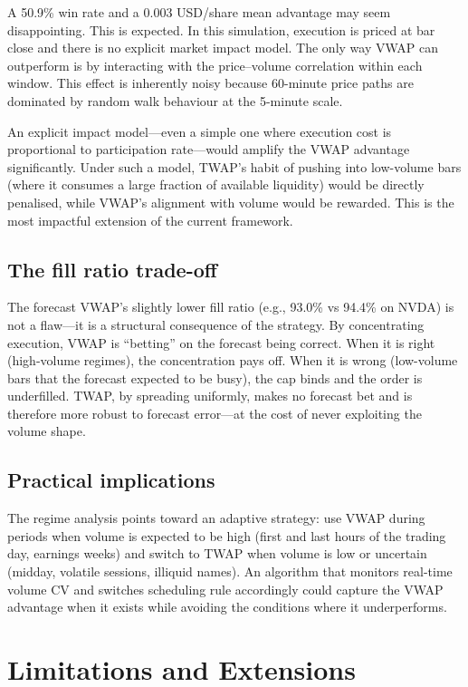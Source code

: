 \documentclass[10pt,twocolumn]{article}
\begin{document}
A 50.9\% win rate and a 0.003 USD/share mean advantage may seem disappointing. This is expected. In this simulation, execution is priced at bar close and there is no explicit market impact model. The only way VWAP can outperform is by interacting with the price--volume correlation within each window. This effect is inherently noisy because 60-minute price paths are dominated by random walk behaviour at the 5-minute scale.

An explicit impact model---even a simple one where execution cost is proportional to participation rate---would amplify the VWAP advantage significantly. Under such a model, TWAP's habit of pushing into low-volume bars (where it consumes a large fraction of available liquidity) would be directly penalised, while VWAP's alignment with volume would be rewarded. This is the most impactful extension of the current framework.

\subsection{The fill ratio trade-off}

The forecast VWAP's slightly lower fill ratio (e.g., 93.0\% vs 94.4\% on NVDA) is not a flaw---it is a structural consequence of the strategy. By concentrating execution, VWAP is ``betting'' on the forecast being correct. When it is right (high-volume regimes), the concentration pays off. When it is wrong (low-volume bars that the forecast expected to be busy), the cap binds and the order is underfilled. TWAP, by spreading uniformly, makes no forecast bet and is therefore more robust to forecast error---at the cost of never exploiting the volume shape.

\subsection{Practical implications}

The regime analysis points toward an adaptive strategy: use VWAP during periods when volume is expected to be high (first and last hours of the trading day, earnings weeks) and switch to TWAP when volume is low or uncertain (midday, volatile sessions, illiquid names). An algorithm that monitors real-time volume CV and switches scheduling rule accordingly could capture the VWAP advantage when it exists while avoiding the conditions where it underperforms.


\section{Limitations and Extensions}
\end{document}
